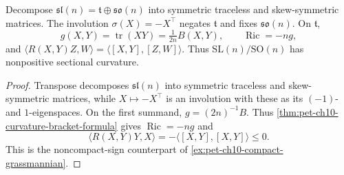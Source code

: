\begin{example}
  \label{ex:pet-ch10-sl-so-quotient}
  Decompose $\mathfrak{sl}(n)=\mathfrak t\oplus\mathfrak{so}(n)$ into symmetric
  traceless and skew-symmetric matrices. The involution
  $\sigma(X)=-X^\top$ negates $\mathfrak t$ and fixes $\mathfrak{so}(n)$. On
  $\mathfrak t$,
  \[
    g(X,Y)=\operatorname{tr}(XY)=\tfrac1{2n}B(X,Y),\qquad
    \operatorname{Ric}=-ng,
  \]
  and $\langle R(X,Y)Z,W\rangle=\langle[X,Y],[Z,W]\rangle$. Thus
  $\mathrm{SL}(n)/\mathrm{SO}(n)$ has nonpositive sectional curvature.
\end{example}
\begin{proof}
  \sketch
  Transpose decomposes $\mathfrak{sl}(n)$ into symmetric traceless and
  skew-symmetric matrices, while $X\mapsto-X^\top$ is an involution with these
  as its $(-1)$- and $1$-eigenspaces. On the first summand,
  $g=(2n)^{-1}B$. Thus
  \cref{thm:pet-ch10-curvature-bracket-formula} gives
  $\operatorname{Ric}=-ng$ and
  \[
    \langle R(X,Y)Y,X\rangle=-\langle[X,Y],[X,Y]\rangle\le0.
  \]
  This is the noncompact-sign counterpart of
  \cref{ex:pet-ch10-compact-grassmannian}.
\end{proof}

